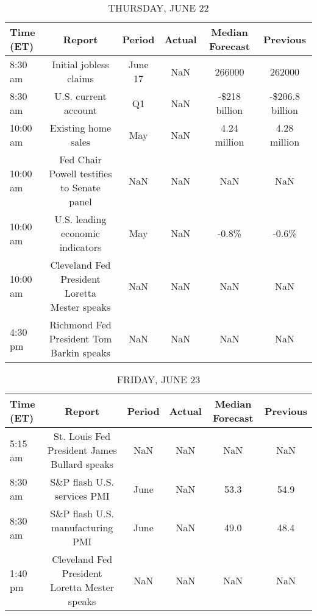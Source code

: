 \documentclass{article}%
\begin{document}
%


\begin{table}[htbp]%
\caption{THURSDAY, JUNE 22}%
\centering%
\begin{adjustbox}{width=1\textwidth}%
\begin{tabular}{lccccc}
\toprule
Time (ET) &                                        Report &  Period & Actual & Median Forecast &        Previous \\
\midrule
  8:30 am &                        Initial jobless claims & June 17 &    NaN &          266000 &          262000 \\
  8:30 am &                          U.S. current account &      Q1 &    NaN &   -\$218 billion & -\$206.8 billion \\
 10:00 am &                           Existing home sales &     May &    NaN &    4.24 million &    4.28 million \\
 10:00 am &    Fed Chair Powell testifies to Senate panel &     NaN &    NaN &             NaN &             NaN \\
 10:00 am &              U.S. leading economic indicators &     May &    NaN &           -0.8\% &           -0.6\% \\
 10:00 am & Cleveland Fed President Loretta Mester speaks &     NaN &    NaN &             NaN &             NaN \\
  4:30 pm &      Richmond Fed President Tom Barkin speaks &     NaN &    NaN &             NaN &             NaN \\
\bottomrule
\end{tabular}
%
\end{adjustbox}%
\end{table}

%


\begin{table}[htbp]%
\caption{FRIDAY, JUNE 23}%
\centering%
\begin{adjustbox}{width=1\textwidth}%
\begin{tabular}{lccccc}
\toprule
Time (ET) &                                        Report & Period & Actual & Median Forecast & Previous \\
\midrule
  5:15 am &  St. Louis Fed President James Bullard speaks &    NaN &    NaN &             NaN &      NaN \\
  8:30 am &                   S\&P flash U.S. services PMI &   June &    NaN &            53.3 &     54.9 \\
  8:30 am &              S\&P flash U.S. manufacturing PMI &   June &    NaN &            49.0 &     48.4 \\
  1:40 pm & Cleveland Fed President Loretta Mester speaks &    NaN &    NaN &             NaN &      NaN \\
\bottomrule
\end{tabular}
%
\end{adjustbox}%
\end{table}
\end{document}
